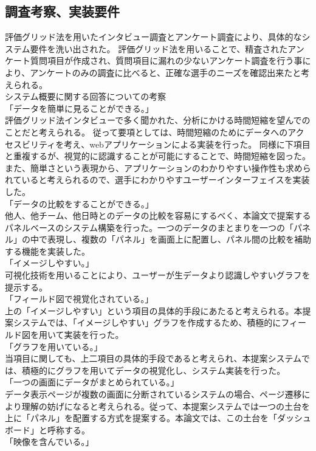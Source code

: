 \documentclass[sotsuron]{kuee}
\begin{document}
\subsection{調査考察、実装要件}
評価グリッド法を用いたインタビュー調査とアンケート調査により、具体的なシステム要件を洗い出された。
評価グリッド法を用いることで、精査されたアンケート質問項目が作成され、質問項目に漏れの少ないアンケート調査を行う事により、アンケートのみの調査に比べると、正確な選手のニーズを確認出来たと考えられる。
\\システム概要に関する回答についての考察
\\「データを簡単に見ることができる。」
\\評価グリッド法インタビューで多く聞かれた、分析にかける時間短縮を望んでのことだと考えられる。
従って要項としては、時間短縮のためにデータへのアクセスビリティを考え、webアプリケーションによる実装を行った。
同様に下項目と重複するが、視覚的に認識することが可能にすることで、時間短縮を図った。
また、簡単さという表現から、アプリケーションのわかりやすい操作性も求められていると考えられるので、選手にわかりやすユーザーインターフェイスを実装した。
\\「データの比較をすることができる。」
\\他人、他チーム、他日時とのデータの比較を容易にするべく、本論文で提案するパネルベースのシステム構築を行った。一つのデータのまとまりを一つの「パネル」の中で表現し、複数の「パネル」を画面上に配置し、パネル間の比較を補助する機能を実装した。
\\「イメージしやすい。」
\\可視化技術を用いることにより、ユーザーが生データより認識しやすいグラフを提示する。
\\「フィールド図で視覚化されている。」
\\上の「イメージしやすい」という項目の具体的手段にあたると考えられる。本提案システムでは、「イメージしやすい」グラフを作成するため、積極的にフィールド図を用いて実装を行った。
\\「グラフを用いている。」
\\当項目に関しても、上二項目の具体的手段であると考えられ、本提案システムでは、積極的にグラフを用いてデータの視覚化し、システム実装を行った。
\\「一つの画面にデータがまとめられている。」
\\データ表示ページが複数の画面に分断されているシステムの場合、ページ遷移により理解の妨げになると考えられる。従って、本提案システムでは一つの土台を上に「パネル」を配置する方式を提案する。本論文では、この土台を「ダッシュボード」と呼称する。
\\「映像を含んでいる。」
\end{document}
